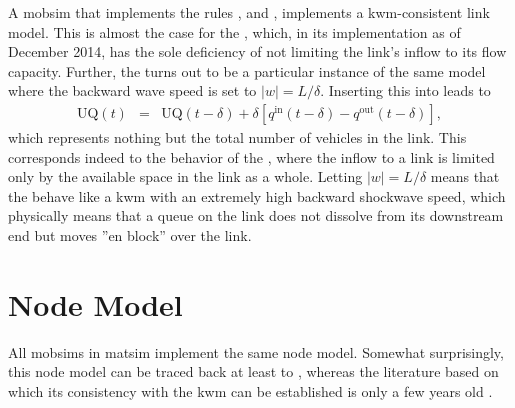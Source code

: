 A \gls{mobsim} that implements the rules , 
and ,  implements a \gls{kwm}-consistent
link model. This is almost the case for the ,
which, in its implementation as of December 2014, has the sole deficiency
of not limiting the link's inflow to its flow capacity. 
%
Further, the  turns out to be a
particular instance of the same model where the backward wave speed
is set to $\left|w\right|=L/\delta$. Inserting this into 
leads to
\begin{eqnarray}
\text{UQ}(t) & = & \text{UQ}(t-\delta)+\delta\left[q^{\text{in}}(t-\delta)-q^{\text{out}}(t-\delta)\right],
\end{eqnarray}
which represents nothing but the total number of vehicles in the link.
This corresponds indeed to the behavior of the ,
where the inflow to a link is limited only by the available space
in the link as a whole. Letting $\left|w\right|=L/\delta$ means that
the  behave like a \gls{kwm} with an extremely
high backward shockwave speed, which physically means that a queue
on the link does not dissolve from its downstream end but moves {}''en
block'' over the link.

\section{\label{sec:Node-model}Node Model}
All \glspl{mobsim} in \gls{matsim} implement the same node model. Somewhat surprisingly,
this node model can be traced back at least to , whereas
the literature based on which its consistency with the \gls{kwm} can be
established is only a few years old \citep{tampere-2010b,floetteroed-2011a,corthout-2012}. 

